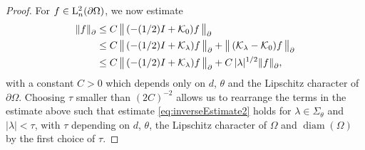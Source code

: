 \begin{proof}
  For $f \in \mathrm{L}^2_n(\partial\Omega)$, we now estimate
  \begin{align*}
    \| f\|^{}_\partial 
    &\leq C\,  \big\|\,(-(1/2)I + \mathcal{K}_0) f \, \big\|^{}_\partial  \\
    &\leq C\,  \big\|\,(-(1/2)I + \mathcal{K}_\lambda)f\, \big\|^{}_\partial + \big\|\, (\mathcal{K}_\lambda - \mathcal{K}_0)f\, \big\|^{}_\partial \\
    &\leq C\,  \big\|\,(-(1/2)I + \mathcal{K}_\lambda)f\, \big\|^{}_\partial + C \, |\lambda|^{1/2} \|f\|^{}_\partial,
  \end{align*}
  with a constant $C > 0$ which depends only on $d$, $\theta$ and the Lipschitz character of $\partial\Omega$.
  Choosing $\tau$ smaller than $(2C)^{-2}$ allows us to rearrange the terms in the estimate above such that estimate \eqref{eq:inverseEstimate2} holds for $\lambda \in \Sigma_\theta$ and $|\lambda| < \tau$, with $\tau$ depending on $d$, $\theta$, the Lipschitz character of $\Omega$ and $\operatorname{diam}(\Omega)$ by the first choice of $\tau$.


\end{proof}
